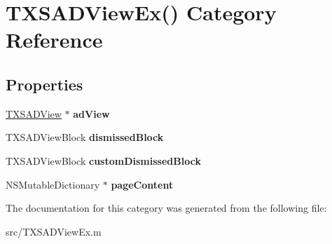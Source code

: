 \hypertarget{category_t_x_s_a_d_view_ex_07_08}{}\section{T\+X\+S\+A\+D\+View\+Ex() Category Reference}
\label{category_t_x_s_a_d_view_ex_07_08}
\subsection*{Properties}
\begin{DoxyCompactItemize}
\item 
\hypertarget{category_t_x_s_a_d_view_ex_07_08_a106510d984f375aa1064fa42b343187b}{}\hyperlink{interface_t_x_s_a_d_view}{T\+X\+S\+A\+D\+View} $\ast$ {\bfseries ad\+View}\label{category_t_x_s_a_d_view_ex_07_08_a106510d984f375aa1064fa42b343187b}

\item 
\hypertarget{category_t_x_s_a_d_view_ex_07_08_aa99a6c4f78c6232b5666bed13cde0d2f}{}T\+X\+S\+A\+D\+View\+Block {\bfseries dismissed\+Block}\label{category_t_x_s_a_d_view_ex_07_08_aa99a6c4f78c6232b5666bed13cde0d2f}

\item 
\hypertarget{category_t_x_s_a_d_view_ex_07_08_a488d47dddf945a3d67388c07242836a8}{}T\+X\+S\+A\+D\+View\+Block {\bfseries custom\+Dismissed\+Block}\label{category_t_x_s_a_d_view_ex_07_08_a488d47dddf945a3d67388c07242836a8}

\item 
\hypertarget{category_t_x_s_a_d_view_ex_07_08_a7c8caac2594a5a07d35aa0c0aa65779a}{}N\+S\+Mutable\+Dictionary $\ast$ {\bfseries page\+Content}\label{category_t_x_s_a_d_view_ex_07_08_a7c8caac2594a5a07d35aa0c0aa65779a}

\end{DoxyCompactItemize}


The documentation for this category was generated from the following file\+:\begin{DoxyCompactItemize}
\item 
src/T\+X\+S\+A\+D\+View\+Ex.\+m\end{DoxyCompactItemize}
